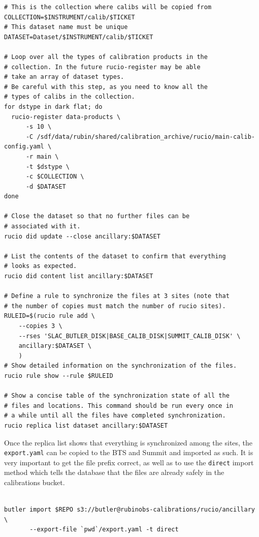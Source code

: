 \documentclass[DM,authoryear,toc]{lsstdoc}
\begin{document}
\begin{verbatim}
# This is the collection where calibs will be copied from
COLLECTION=$INSTRUMENT/calib/$TICKET
# This dataset name must be unique
DATASET=Dataset/$INSTRUMENT/calib/$TICKET

# Loop over all the types of calibration products in the
# collection. In the future rucio-register may be able
# take an array of dataset types.
# Be careful with this step, as you need to know all the
# types of calibs in the collection.
for dstype in dark flat; do
  rucio-register data-products \
      -s 10 \
      -C /sdf/data/rubin/shared/calibration_archive/rucio/main-calib-config.yaml \
      -r main \
      -t $dstype \
      -c $COLLECTION \
      -d $DATASET
done

# Close the dataset so that no further files can be
# associated with it.
rucio did update --close ancillary:$DATASET

# List the contents of the dataset to confirm that everything
# looks as expected.
rucio did content list ancillary:$DATASET

# Define a rule to synchronize the files at 3 sites (note that
# the number of copies must match the number of rucio sites).
RULEID=$(rucio rule add \
    --copies 3 \
    --rses 'SLAC_BUTLER_DISK|BASE_CALIB_DISK|SUMMIT_CALIB_DISK' \
    ancillary:$DATASET \
    )
# Show detailed information on the synchronization of the files.
rucio rule show --rule $RULEID

# Show a concise table of the synchronization state of all the
# files and locations. This command should be run every once in
# a while until all the files have completed synchronization.
rucio replica list dataset ancillary:$DATASET

\end{verbatim}

Once the replica list shows that everything is synchronized among the sites, the \texttt{export.yaml} can be copied to the BTS and Summit and imported as such.
It is very important to get the file prefix correct, as well as to use the \texttt{direct} import method which tells the database that the files are already safely in the calibrations bucket.

\begin{verbatim}

butler import $REPO s3://butler@rubinobs-calibrations/rucio/ancillary \
       --export-file `pwd`/export.yaml -t direct

\end{verbatim}
\end{document}
